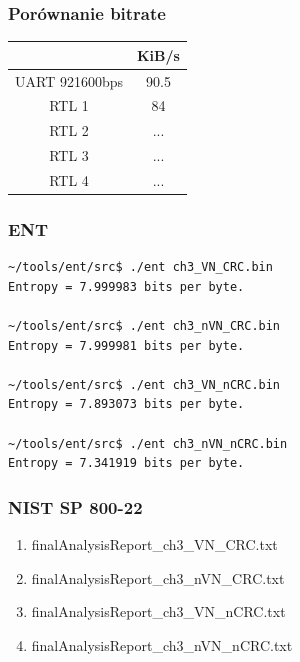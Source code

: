 \documentclass{beamer}
\begin{document}
\begin{frame}
\frametitle{Porównanie bitrate}

\begin{center}
\begin{tabular}{ |c|c| } 
 \hline
  & KiB/s \\ 
 \hline
 UART 921600bps & 90.5 \\ 
 \hline
 RTL 1 & 84 \\ 
 \hline
 RTL 2 & ... \\ 
 \hline
 RTL 3 & ... \\
 \hline
 RTL 4 & ... \\  
 \hline
\end{tabular}
\end{center}

\end{frame}
\begin{frame}[fragile]
\frametitle{ENT}

\begin{verbatim}
~/tools/ent/src$ ./ent ch3_VN_CRC.bin 
Entropy = 7.999983 bits per byte.

~/tools/ent/src$ ./ent ch3_nVN_CRC.bin 
Entropy = 7.999981 bits per byte.

~/tools/ent/src$ ./ent ch3_VN_nCRC.bin 
Entropy = 7.893073 bits per byte.

~/tools/ent/src$ ./ent ch3_nVN_nCRC.bin 
Entropy = 7.341919 bits per byte.
\end{verbatim}
\end{frame}
\begin{frame}
\frametitle{NIST SP 800-22}


\begin{enumerate}
    \item finalAnalysisReport\_ch3\_VN\_CRC.txt
    \item finalAnalysisReport\_ch3\_nVN\_CRC.txt
    \item finalAnalysisReport\_ch3\_VN\_nCRC.txt
    \item finalAnalysisReport\_ch3\_nVN\_nCRC.txt
\end{enumerate}

\end{frame}
\end{document}
